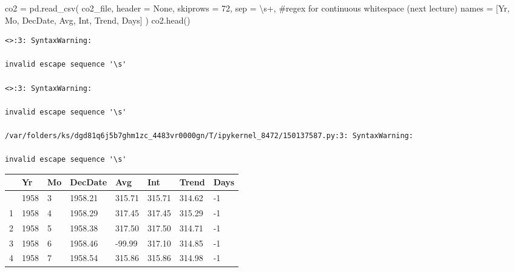 \documentclass[
  letterpaper,
  DIV=11,
  numbers=noendperiod]{scrreprt}
\newenvironment{Shaded}{\begin{snugshade}}{\end{snugshade}}
\newcommand{\CommentTok}[1]{\textcolor[rgb]{0.37,0.37,0.37}{#1}}
\newcommand{\DecValTok}[1]{\textcolor[rgb]{0.68,0.00,0.00}{#1}}
\newcommand{\NormalTok}[1]{\textcolor[rgb]{0.00,0.23,0.31}{#1}}
\newcommand{\OperatorTok}[1]{\textcolor[rgb]{0.37,0.37,0.37}{#1}}
\newcommand{\StringTok}[1]{\textcolor[rgb]{0.13,0.47,0.30}{#1}}
\newcommand{\VariableTok}[1]{\textcolor[rgb]{0.07,0.07,0.07}{#1}}
\begin{document}
\begin{Shaded}
\begin{Highlighting}[]
\NormalTok{co2 }\OperatorTok{=}\NormalTok{ pd.read\_csv(}
\NormalTok{    co2\_file, header }\OperatorTok{=} \VariableTok{None}\NormalTok{, skiprows }\OperatorTok{=} \DecValTok{72}\NormalTok{,}
\NormalTok{    sep }\OperatorTok{=} \StringTok{\textquotesingle{}\textbackslash{}s+\textquotesingle{}}\NormalTok{, }\CommentTok{\#regex for continuous whitespace (next lecture)}
\NormalTok{    names }\OperatorTok{=}\NormalTok{ [}\StringTok{\textquotesingle{}Yr\textquotesingle{}}\NormalTok{, }\StringTok{\textquotesingle{}Mo\textquotesingle{}}\NormalTok{, }\StringTok{\textquotesingle{}DecDate\textquotesingle{}}\NormalTok{, }\StringTok{\textquotesingle{}Avg\textquotesingle{}}\NormalTok{, }\StringTok{\textquotesingle{}Int\textquotesingle{}}\NormalTok{, }\StringTok{\textquotesingle{}Trend\textquotesingle{}}\NormalTok{, }\StringTok{\textquotesingle{}Days\textquotesingle{}}\NormalTok{]}
\NormalTok{)}
\NormalTok{co2.head()}
\end{Highlighting}
\end{Shaded}

\begin{verbatim}
<>:3: SyntaxWarning:

invalid escape sequence '\s'

<>:3: SyntaxWarning:

invalid escape sequence '\s'

/var/folders/ks/dgd81q6j5b7ghm1zc_4483vr0000gn/T/ipykernel_8472/150137587.py:3: SyntaxWarning:

invalid escape sequence '\s'
\end{verbatim}

\begin{longtable}[]{@{}llllllll@{}}
\toprule\noalign{}
& Yr & Mo & DecDate & Avg & Int & Trend & Days \\
\midrule\noalign{}
\endhead
\bottomrule\noalign{}
\endlastfoot
0 & 1958 & 3 & 1958.21 & 315.71 & 315.71 & 314.62 & -1 \\
1 & 1958 & 4 & 1958.29 & 317.45 & 317.45 & 315.29 & -1 \\
2 & 1958 & 5 & 1958.38 & 317.50 & 317.50 & 314.71 & -1 \\
3 & 1958 & 6 & 1958.46 & -99.99 & 317.10 & 314.85 & -1 \\
4 & 1958 & 7 & 1958.54 & 315.86 & 315.86 & 314.98 & -1 \\
\end{longtable}
\end{document}
